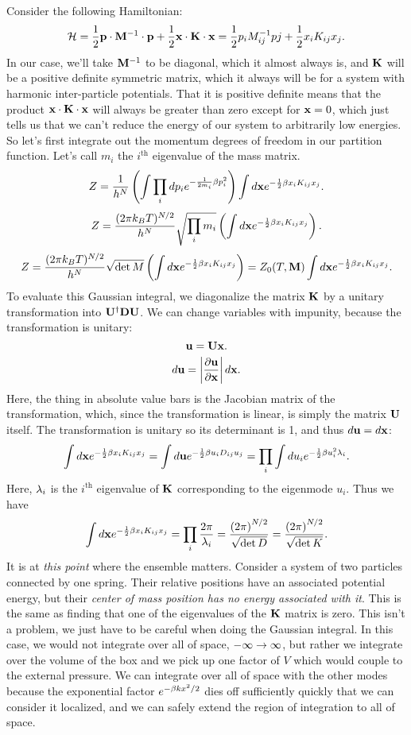 \documentclass[12pt]{article}
\begin{document}
Consider the following Hamiltonian:
\[\mathcal{H} = \frac{1}{2} \mathbf{p} \cdot \mathbf{M} ^{-1} \cdot \mathbf{p} + \frac{1}{2} \mathbf{x} \cdot \mathbf{K} \cdot \mathbf{x} = \frac{1}{2}p_i M^{-1}_{ij} pj + \frac{1}{2}x_i K_{ij}x_j.\]
In our case, we'll take $\mathbf{M}^{-1}$ to be diagonal, which it almost always is, and $\mathbf{K}$ will be a positive definite symmetric matrix, which it always will be for a system with harmonic inter-particle potentials. That it is positive definite means that the product $\mathbf{x} \cdot \mathbf{K} \cdot \mathbf{x}$ will always be greater than zero except for $\mathbf{x} = 0$, which just tells us that we can't reduce the energy of our system to arbitrarily low energies. So let's first integrate out the momentum degrees of freedom in our partition function. Let's call $m_i$ the $i^\mathrm{th}$ eigenvalue of the mass matrix.
\[ Z = \frac{1}{h^N} \left(\int \prod_idp_i e^{-\frac{1}{2m_i}\beta p_i^2}\right)\int d\mathbf{x} e^{-\frac{1}{2}\beta x_iK_{ij}x_j}.\]
\[ Z = \frac{(2\pi k_BT)^{N/2}}{h^N}\sqrt{\prod_i m_i} \left(\int d\mathbf{x} e^{-\frac{1}{2}\beta x_iK_{ij}x_j}\right).\]
\[ Z = \frac{(2\pi k_BT)^{N/2}}{h^N}\sqrt{\det M} \left(\int d\mathbf{x} e^{-\frac{1}{2}\beta x_iK_{ij}x_j}\right) = Z_0(T,\mathbf{M}) \int d\mathbf{x} e^{-\frac{1}{2}\beta x_iK_{ij}x_j}.\]
To evaluate this Gaussian integral, we diagonalize the matrix $\mathbf{K}$ by a unitary transformation into $\mathbf{U}^\dagger \mathbf{D} \mathbf{U}$. We can change variables with impunity, because the transformation is unitary:
\[ \mathbf{u} = \mathbf{U} \mathbf{x}.\]
\[ d\mathbf{u} = \left | \frac{\partial {\mathbf{u}}}{\partial {\mathbf{x}}} \right | d\mathbf{x}.\]
Here, the thing in absolute value bars is the Jacobian matrix of the transformation, which, since the transformation is linear, is simply the matrix $\mathbf{U}$ itself. The transformation is unitary so its determinant is 1, and thus $d\mathbf{u} = d\mathbf{x}$:
\[ \int d\mathbf{x} e^{-\frac{1}{2}\beta x_i K_{ij} x_j} = \int d\mathbf{u} e^{-\frac{1}{2}\beta u_i D_{ij} u_j} = \prod_i \int du_i e^{-\frac{1}{2} \beta u_i^2 \lambda_i}.\]
Here, $\lambda_i$ is the $i^\mathrm{th}$ eigenvalue of $\mathbf{K}$ corresponding to the eigenmode $u_i$. Thus we have
\[ \int d\mathbf{x} e^{-\frac{1}{2}\beta x_i K_{ij} x_j} = \prod_i \frac{2\pi}{\lambda_i} = \frac{\left(2\pi\right)^{N/2}}{\sqrt{\det D}} = \frac{\left(2\pi\right)^{N/2}}{\sqrt{\det K}}.\]
It is at \emph{this point} where the ensemble matters. Consider a system of two particles connected by one spring. Their relative positions have an associated potential energy, but their \emph{center of mass position has no energy associated with it}. This is the same as finding that one of the eigenvalues of the $\mathbf{K}$ matrix is zero. This isn't a problem, we just have to be careful when doing the Gaussian integral. In this case, we would not integrate over all of space, $-\infty \rightarrow \infty$, but rather we integrate over the volume of the box and we pick up one factor of $V$ which would couple to the external pressure. We can integrate over all of space with the other modes because the exponential factor $e^{-\beta k x^2/2}$ dies off sufficiently quickly that we can consider it localized, and we can safely extend the region of integration to all of space.
\end{document}
